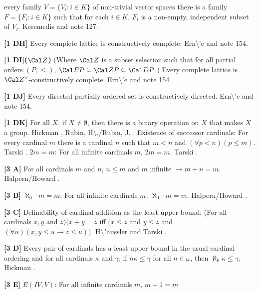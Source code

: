 every family $V = \{V_i : i \in K\}$ of non-trivial vector spaces there is
a family $F = \{F_i : i\in K\}$ such that for each $i\in K$, $F_i$ is a
non-empty, independent subset of $V_i$. \ac{Keremedis} \cite{2001a} and
note 127.
\item{}{\bf [1 DH]} Every complete lattice is constructively
complete.  \ac{Ern\'e} \cite{2000} and note 154.
\smallskip
\item{}{\bf [1 DI]($\Cal Z$)} (Where $\Cal Z$ is a subset selection
such that for all partial orders $(P,\le)$, $\Cal E P\subseteq \Cal
Z P\subseteq \Cal D P$.) Every complete lattice is $\Cal
Z^\lor$-constructively complete.  \ac{Ern\'e} \cite{2000} and note
154
\smallskip
\item{}{\bf [1 DJ]} Every directed partially ordered set is
constructively directed.  \ac{Ern\'e} \cite{2000} and note 154.
 
\smallskip
\item{}{\bf [1 DK]} For all $X$, if $X\neq\emptyset$, then there is a
binary operation on $X$ that makes $X$ a group.  \ac{Hickman} \cite{1976},
\ac{Rubin, H\./Rubin, J.} \cite{1985 p.110, AL14}.
\medskip
{} Existence of successor cardinals: For every cardinal
$m$ there is a cardinal $n$ such that $m < n$ and $(\forall p < n)(p \le
m)$.  \ac{Tarski} \cite{1954a}.
\medskip
{} $2m = m$: For all infinite cardinals $m$, $2m = m$.
\ac{Tarski} \cite{1954a}.
\smallskip
\item{}{\bf [3 A]} For all cardinals $m$ and $n$, $n\le m$ and $m$
infinite $\rightarrow m + n = m$.  \ac{Halpern/Howard} \cite{1970}.
\smallskip
\item{}{\bf [3 B]} $\aleph_{0}\cdot m = m$:  For all infinite cardinals
$m$, $\aleph_{0}\cdot m  =  m$.  \ac{Halpern/Howard} \cite{1970}.
\smallskip
\item{}{\bf [3 C]}  Definability of cardinal addition as the least upper
bound: (For all cardinals $x, y$ and $z)( x + y = z$ iff $( x \le  z$
and $y \le  z$ and $(\forall  u)( x,y \le  u \rightarrow  z \le  u))$.
\ac{H\"aussler}  \cite{1983} and \ac{Tarski} \cite{1949a}.
\smallskip
\item{}{\bf [3 D]}  Every pair of cardinals has a least upper bound in
the usual cardinal ordering and for all cardinals $\kappa$ and $\gamma$,
if $n\kappa  \le  \gamma $ for all $n \in  \omega $, then
$\aleph _{0}\kappa  \le  \gamma $.  \ac{Hickman} \cite{1979b}.
\smallskip
\item{}{\bf [3 E]} $E(IV,V)$: For all infinite cardinals $m$, $m + 1 = m$
